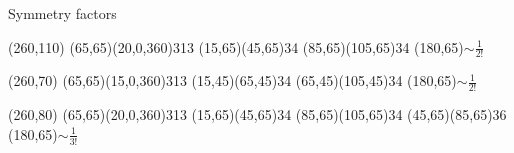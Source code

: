 Symmetry factors

\begin{axopicture}(260,110) %
	\GluonArc(65,65)(20,0,360){3}{13}
	\Gluon(15,65)(45,65){3}{4}
	\Gluon(85,65)(105,65){3}{4}
	\Text(180,65){$\sim \frac{1}{2!}$}
\end{axopicture}

\begin{axopicture}(260,70) %
	\GluonArc(65,65)(15,0,360){3}{13}
	\Gluon(15,45)(65,45){3}{4}
	\Gluon(65,45)(105,45){3}{4}
	\Text(180,65){$\sim \frac{1}{2!}$}
\end{axopicture}

\begin{axopicture}(260,80) %
	\GluonArc(65,65)(20,0,360){3}{13}
	\Gluon(15,65)(45,65){3}{4}
	\Gluon(85,65)(105,65){3}{4}
	\Gluon(45,65)(85,65){3}{6}
	\Text(180,65){$\sim \frac{1}{3!}$}
\end{axopicture}
